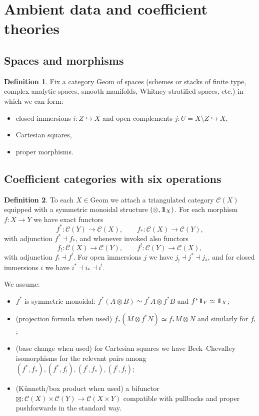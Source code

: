 \documentclass[10pt,a4paper,dvipsnames,x11names]{amsart}
\newcommand{\one}{1\hskip-3.5pt1}
\newcommand{\C}{\mathcal C}
\newcommand{\Geom}{\mathrm{Geom}}
\numberwithin{equation}{section}
\theoremstyle{plain}
\theoremstyle{definition}
\newtheorem{definition}[definition]{Definition}
\theoremstyle{remark}
\begin{document}
\section{Ambient data and coefficient theories}\label{sec:ambient}

\subsection{Spaces and morphisms}

\begin{definition} \label{def:Geom}
Fix a category $\Geom$ of spaces (schemes or stacks of finite type, complex analytic spaces,
smooth manifolds, Whitney-stratified spaces, etc.) in which we can form:
\begin{itemize}
\item closed immersions $i:Z\hookrightarrow X$ and open complements $j:U=X\setminus Z\hookrightarrow X$,
\item Cartesian squares,
\item proper morphisms.
\end{itemize}
\end{definition}

\subsection{Coefficient categories with six operations}

\begin{definition} \label{def:sixfun}
To each $X\in\Geom$ we attach a triangulated category $\C(X)$ equipped with
a symmetric monoidal structure $(\otimes,\one_X)$.
For each morphism $f:X\to Y$ we have exact functors
$$
f^*:\C(Y)\to\C(X),\qquad f_*:\C(X)\to\C(Y),
$$
with adjunction $f^*\dashv f_*$, and whenever invoked also functors
$$
f_!:\C(X)\to\C(Y),\qquad f^!:\C(Y)\to\C(X),
$$
with adjunction $f_!\dashv f^!$.
For open immersions $j$ we have $j_!\dashv j^*\dashv j_*$, and for closed immersions $i$ we have
$i^*\dashv i_*\dashv i^!$.

We assume:
\begin{itemize}
\item $f^*$ is symmetric monoidal: $f^*(A\otimes B)\simeq f^*A\otimes f^*B$ and $f^*\one_Y\simeq \one_X$;
\item (projection formula when used) $f_*(M\otimes f^*N)\simeq f_*M\otimes N$ and similarly for $f_!$;
\item (base change when used) for Cartesian squares we have Beck--Chevalley isomorphisms
for the relevant pairs among $(f^*,f_*),(f^*,f_!),(f^!,f_*),(f^!,f_!)$;
\item (K\"unneth/box product when used) a bifunctor $\boxtimes:\C(X)\times\C(Y)\to\C(X\times Y)$
compatible with pullbacks and proper pushforwards in the standard way.
\end{itemize}
\end{definition}
\end{document}
